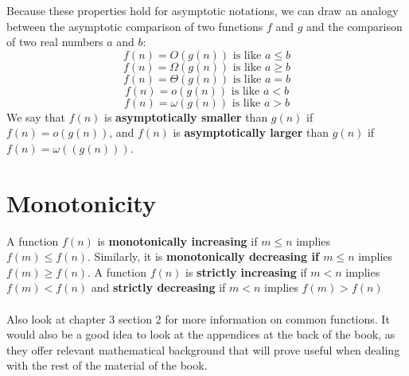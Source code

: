 \documentclass{article}
\begin{document}
Because these properties hold for asymptotic notations, we can draw an analogy between the asymptotic comparison of two functions $f$ and $g$ and the comparison of two real numbers $a$ and $b$:
\begin{equation*}
f(n) = O{(g(n))} \text{ is like } a \leq b
\end{equation*}
\begin{equation*}
f(n) = \Omega{(g(n))} \text{ is like } a \geq b
\end{equation*}
\begin{equation*}
f(n) = \Theta{(g(n))} \text{ is like } a = b
\end{equation*}
\begin{equation*}
f(n) = o{(g(n))} \text{ is like } a < b
\end{equation*}
\begin{equation*}
f(n) = \omega{(g(n))} \text{ is like } a > b
\end{equation*}
We say that $f(n)$ is \textbf{asymptotically smaller} than $g(n)$ if $f(n) = o(g(n))$, and $f(n)$ is \textbf{asymptotically larger} than $g(n)$ if $f(n) = \omega{((g(n)))}$.

\newpage
\section*{Monotonicity}
A function $f(n)$ is \textbf{monotonically increasing} if $m \leq n$ implies $f(m) \leq f(n)$. Similarly, it is \textbf{monotonically decreasing if $m \leq n$} implies $f(m) \geq f(n)$. A function $f(n)$ is \textbf{strictly increasing} if $m < n$ implies $f(m) < f(n)$ and \textbf{strictly decreasing} if $m < n$ implies $f(m) > f(n)$
\\ \\
Also look at chapter 3 section 2 for more information on common functions. It would also be a good idea to look at the appendices at the back of the book, as they offer relevant mathematical background that will prove useful when dealing with the rest of the material of the book.
\end{document}
